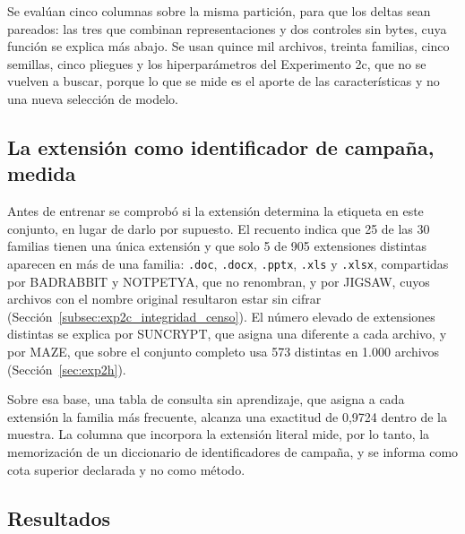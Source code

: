 Se evalúan cinco columnas sobre la misma partición, para que los deltas sean pareados: las tres que combinan representaciones y dos controles sin bytes, cuya función se explica más abajo. Se usan quince mil archivos, treinta familias, cinco semillas, cinco pliegues y los hiperparámetros del Experimento 2c, que no se vuelven a buscar, porque lo que se mide es el aporte de las características y no una nueva selección de modelo.

\subsection{La extensión como identificador de campaña, medida}

Antes de entrenar se comprobó si la extensión determina la etiqueta en este conjunto, en lugar de darlo por supuesto. El recuento indica que 25 de las 30 familias tienen una única extensión y que solo 5 de 905 extensiones distintas aparecen en más de una familia: \texttt{.doc}, \texttt{.docx}, \texttt{.pptx}, \texttt{.xls} y \texttt{.xlsx}, compartidas por BADRABBIT y NOTPETYA, que no renombran, y por JIGSAW, cuyos archivos con el nombre original resultaron estar sin cifrar (Sección~\ref{subsec:exp2c_integridad_censo}). El número elevado de extensiones distintas se explica por SUNCRYPT, que asigna una diferente a cada archivo, y por MAZE, que sobre el conjunto completo usa 573 distintas en 1.000 archivos (Sección~\ref{sec:exp2h}).

Sobre esa base, una tabla de consulta sin aprendizaje, que asigna a cada extensión la familia más frecuente, alcanza una exactitud de 0,9724 dentro de la muestra. La columna que incorpora la extensión literal mide, por lo tanto, la memorización de un diccionario de identificadores de campaña, y se informa como cota superior declarada y no como método.

\subsection{Resultados}

